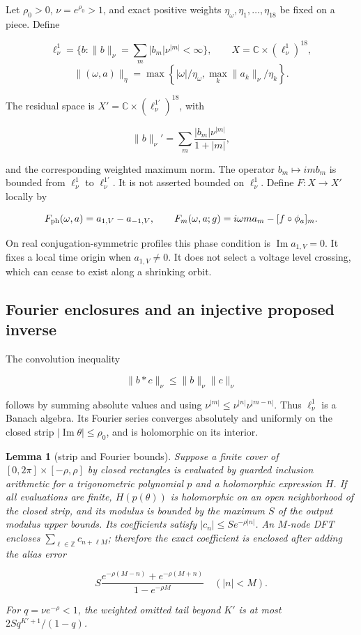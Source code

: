 \documentclass[11pt]{article}
\newtheorem{lemma}{Lemma}[section]
\theoremstyle{definition}
\begin{document}
Let $\rho_0>0$, $\nu=e^{\rho_0}>1$, and exact positive weights $\eta_\omega,\eta_1,\ldots,\eta_{18}$ be fixed on a piece. Define

\[
 \ell^1_\nu=\{b:\|b\|_\nu=\sum_m|b_m|\nu^{|m|}<\infty\},\qquad
 X=\mathbb C\times(\ell^1_\nu)^{18},
\]
\[
 \| (\omega,a)\|_\eta
 =\max\left\{|\omega|/\eta_\omega,
             \max_k\|a_k\|_\nu/\eta_k\right\}.
\]

The residual space is $X'=\mathbb C\times(\ell^{1\prime}_\nu)^{18}$, with

\[
 \|b\|_{\nu}'=\sum_m\frac{|b_m|\nu^{|m|}}{1+|m|},
\]

and the corresponding weighted maximum norm. The operator $b_m\mapsto im b_m$ is bounded from $\ell^1_\nu$ to $\ell^{1\prime}_\nu$. It is not asserted bounded on $\ell^1_\nu$. Define $F:X\to X'$ locally by

\[
 F_{\rm ph}(\omega,a)=a_{1,V}-a_{-1,V},\qquad
 F_m(\omega,a;g)=i\omega m a_m-[f\circ\phi_a]_m.
\]

On real conjugation-symmetric profiles this phase condition is $\operatorname{Im}a_{1,V}=0$. It fixes a local time origin when $a_{1,V}\ne0$. It does not select a voltage level crossing, which can cease to exist along a shrinking orbit.

\subsection{Fourier enclosures and an injective proposed inverse}\label{sec:cg-2}

The convolution inequality

\[
 \|b*c\|_\nu\le\|b\|_\nu\|c\|_\nu
\]

follows by summing absolute values and using $\nu^{|m|}\le\nu^{|n|}\nu^{|m-n|}$. Thus $\ell^1_\nu$ is a Banach algebra. Its Fourier series converges absolutely and uniformly on the closed strip $|\operatorname{Im}\theta|\le\rho_0$, and is holomorphic on its interior.

\begin{lemma}[strip and Fourier bounds]\label{lem:cg-2-1} Suppose a finite cover of $[0,2\pi]\times[-\rho,\rho]$ by closed rectangles is evaluated by guarded inclusion arithmetic for a trigonometric polynomial $p$ and a holomorphic expression $H$. If all evaluations are finite, $H(p(\theta))$ is holomorphic on an open neighborhood of the closed strip, and its modulus is bounded by the maximum $S$ of the output modulus upper bounds. Its coefficients satisfy $|c_n|\le S e^{-\rho|n|}$. An $M$-node DFT encloses $\sum_{\ell\in\mathbb Z}c_{n+\ell M}$; therefore the exact coefficient is enclosed after adding the alias error

\[
 S\frac{e^{-\rho(M-n)}+e^{-\rho(M+n)}}{1-e^{-\rho M}}
 \quad (|n|<M).
\]

For $q=\nu e^{-\rho}<1$, the weighted omitted tail beyond $K'$ is at most $2S q^{K'+1}/(1-q)$.

\end{lemma}
\end{document}

